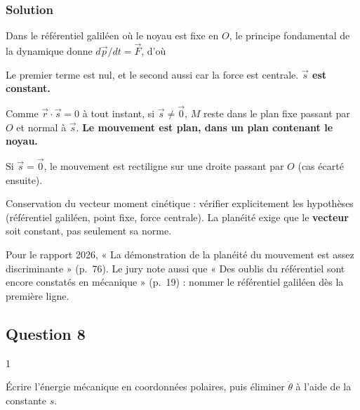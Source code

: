 \documentclass[11pt,a4paper]{article}
\newcommand{\equationajustee}[1]{%
  \sbox{\boiteequation}{$\displaystyle #1$}%
  \ifdim\wd\boiteequation>\linewidth
    \[\resizebox{\linewidth}{!}{\usebox{\boiteequation}}\]%
  \else
    \[#1\]%
  \fi}
\begin{document}
\hypertarget{solution-6}{%
\subsubsection{Solution}\label{solution-6}}

Dans le référentiel galiléen où le noyau est fixe en \(O\), le principe fondamental de la dynamique donne \(d\vec p/dt=\vec F\), d'où

\equationajustee{\frac{d\vec s}{dt}=\vec v\wedge m_e\vec v+\vec r\wedge\vec F.}

Le premier terme est nul, et le second aussi car la force est centrale. \textbf{\(\vec s\) est constant.}

Comme \(\vec r\cdot\vec s=0\) à tout instant, si \(\vec s\neq\vec0\), \(M\) reste dans le plan fixe passant par \(O\) et normal à \(\vec s\). \textbf{Le mouvement est plan, dans un plan contenant le noyau.}

Si \(\vec s=\vec0\), le mouvement est rectiligne sur une droite passant par \(O\) (cas écarté ensuite).

\begin{methode}

Conservation du vecteur moment cinétique : vérifier explicitement les hypothèses (référentiel galiléen, point fixe, force centrale). La planéité exige que le \textbf{vecteur} soit constant, pas seulement sa norme.

\end{methode}

\begin{jury}

Pour le rapport 2026, « La démonstration de la planéité du mouvement est assez discriminante » (p.~76). Le jury note aussi que « Des oublis du référentiel sont encore constatés en mécanique » (p.~19) : nommer le référentiel galiléen dès la première ligne.

\end{jury}

\hypertarget{question-8}{%
\subsection{Question 8}\label{question-8}}

\begin{indication}{1}

Écrire l'énergie mécanique en coordonnées polaires, puis éliminer \(\dot\theta\) à l'aide de la constante \(s\).

\end{indication}
\end{document}
